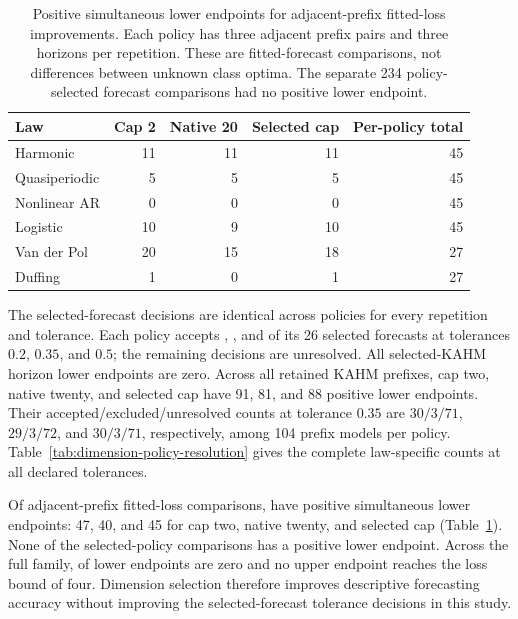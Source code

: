 \begin{table}[t]
\centering\small
\begin{tabular}{@{}lrrrr@{}}
\toprule
Law & Cap 2 & Native 20 & Selected cap & Per-policy total \\
\midrule
Harmonic & 11 & 11 & 11 & 45 \\
Quasiperiodic & 5 & 5 & 5 & 45 \\
Nonlinear AR & 0 & 0 & 0 & 45 \\
Logistic & 10 & 9 & 10 & 45 \\
Van der Pol & 20 & 15 & 18 & 27 \\
Duffing & 1 & 0 & 1 & 27 \\
\bottomrule
\end{tabular}
\caption{Positive simultaneous lower endpoints for adjacent-prefix
fitted-loss improvements. Each policy has three adjacent prefix pairs
and three horizons per repetition. These are fitted-forecast comparisons,
not differences between unknown class optima. The separate 234
policy-selected forecast comparisons had no positive lower endpoint.}
\label{tab:dimension-policy-improvements}
\end{table}


The selected-forecast decisions are identical across policies for every
repetition and tolerance. Each policy accepts \DimAcceptLow{}, \DimAcceptMedium{},
and \DimAcceptHigh{} of its 26 selected forecasts at tolerances
$0.2$, $0.35$, and $0.5$; the remaining decisions are unresolved.
All \DimSelectedLowerZero{} selected-KAHM horizon lower endpoints are zero.
Across all retained KAHM prefixes, cap two, native twenty, and selected cap
have 91, 81, and 88 positive lower endpoints. Their accepted/excluded/unresolved
counts at tolerance $0.35$ are $30/3/71$, $29/3/72$, and $30/3/71$,
respectively, among 104 prefix models per policy.
Table~\ref{tab:dimension-policy-resolution} gives the complete law-specific
counts at all declared tolerances.

Of \DimPrefixTails{} adjacent-prefix fitted-loss comparisons,
\DimPositivePrefix{} have positive simultaneous lower endpoints: 47, 40,
and 45 for cap two, native twenty, and selected cap
(Table~\ref{tab:dimension-policy-improvements}). None of the
\DimPolicyTails{} selected-policy comparisons has a positive lower endpoint.
Across the full family, \DimAllLowerZero{} of \DimAllLowerCount{} lower
endpoints are zero and no upper endpoint reaches the loss bound of four.
Dimension selection therefore improves descriptive forecasting accuracy
without improving the selected-forecast tolerance decisions in this study.

